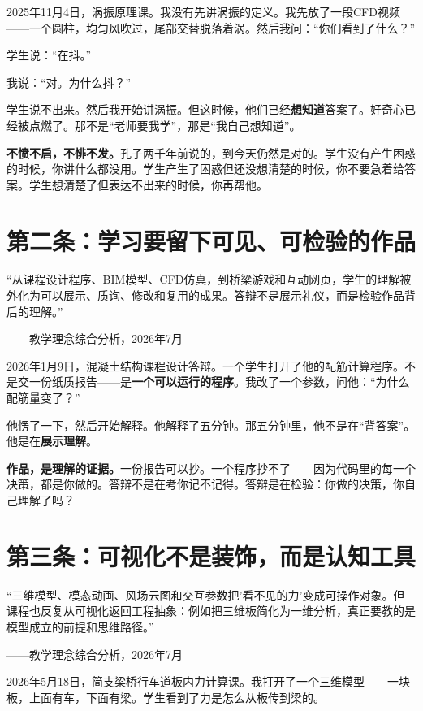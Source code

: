 2025年11月4日，涡振原理课。我没有先讲涡振的定义。我先放了一段CFD视频——一个圆柱，均匀风吹过，尾部交替脱落着涡。然后我问：``你们看到了什么？''

学生说：``在抖。''

我说：``对。为什么抖？''

学生说不出来。然后我开始讲涡振。但这时候，他们已经\textbf{想知道}答案了。好奇心已经被点燃了。那不是``老师要我学''，那是``我自己想知道''。

\textbf{不愤不启，不悱不发。}孔子两千年前说的，到今天仍然是对的。学生没有产生困惑的时候，你讲什么都没用。学生产生了困惑但还没想清楚的时候，你不要急着给答案。学生想清楚了但表达不出来的时候，你再帮他。

\section{第二条：学习要留下可见、可检验的作品}

\begin{shiyu-inline}
``从课程设计程序、BIM模型、CFD仿真，到桥梁游戏和互动网页，学生的理解被外化为可以展示、质询、修改和复用的成果。答辩不是展示礼仪，而是检验作品背后的理解。''

\hfill ——教学理念综合分析，2026年7月
\end{shiyu-inline}

2026年1月9日，混凝土结构课程设计答辩。一个学生打开了他的配筋计算程序。不是交一份纸质报告——是\textbf{一个可以运行的程序}。我改了一个参数，问他：``为什么配筋量变了？''

他愣了一下，然后开始解释。他解释了五分钟。那五分钟里，他不是在``背答案''。他是在\textbf{展示理解}。

\textbf{作品，是理解的证据。}一份报告可以抄。一个程序抄不了——因为代码里的每一个决策，都是你做的。答辩不是在考你记不记得。答辩是在检验：你做的决策，你自己理解了吗？

\section{第三条：可视化不是装饰，而是认知工具}

\begin{shiyu-inline}
``三维模型、模态动画、风场云图和交互参数把'看不见的力'变成可操作对象。但课程也反复从可视化返回工程抽象：例如把三维板简化为一维分析，真正要教的是模型成立的前提和思维路径。''

\hfill ——教学理念综合分析，2026年7月
\end{shiyu-inline}

2026年5月18日，简支梁桥行车道板内力计算课。我打开了一个三维模型——一块板，上面有车，下面有梁。学生看到了力是怎么从板传到梁的。

